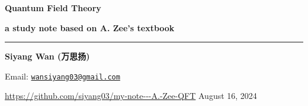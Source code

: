 \begin{titlepage}
	\vspace*{100pt}
	
	{\Huge \textbf{Quantum Field Theory}}
	
	\vspace{10pt}
	
	{\LARGE \textbf{a study note based on A. Zee's textbook}}
	
	\vspace{20pt}
	
	\noindent\rule[0.5ex]{\linewidth}{1.5pt} %
	
	\vspace{20pt}
	
	{\large \textbf{Siyang Wan (万思扬)} }
	
	\vfill
	
	Email: \href{mailto:wansiyang03@gmail.com}{\texttt{wansiyang03@gmail.com}}
	
	\url{https://github.com/siyang03/my-note---A.-Zee-QFT} \hfill August 16, 2024
\end{titlepage}
